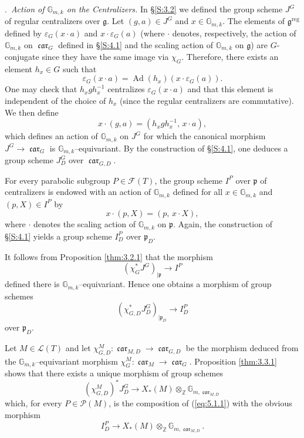 \documentclass[12pt,a4paper,oneside,english,leqno]{smfart}
\makeatletter
\numberwithin{equation}{subsection}
\numberwithin{theo}{subsection}
\newenvironment{paragr}[1][]{\medskip\refstepcounter{subsection}%
  \par\noindent\hspace*{\parindent}\thesubsection.\ \emph{#1}%
  \@ifundefined{@empty}{}{}\ignorespaces}{\medskip}
\theoremstyle{plain}
\theoremstyle{definition}
\theoremstyle{remark}
\DeclareMathOperator{\reg}{reg}
\DeclareMathOperator{\Ad}{Ad}
\DeclareMathOperator{\car}{\mathfrak{car}}
\newcommand{\ZZ}{\mathbb{Z}}
\newcommand{\Gmk}{\mathbb{G}_{m,k}}
\newcommand{\lc}{\mathcal{L}}
\newcommand{\fc}{\mathcal{F}}
\newcommand{\pc}{\mathcal{P}}
\newcommand{\ggo}{\mathfrak{g}}
\newcommand{\pgo}{\mathfrak{p}}
\newcommand{\eps}{\varepsilon}
\makeatother
\begin{document}
\begin{paragr}[Action of $\Gmk$ on the Centralizers.]\label{S:5.1}
In §\ref{S:3.2} we defined the group scheme $J^G$ of regular centralizers over $\ggo$. Let $(g,a)\in J^G$ and $x\in \Gmk$. The elements of $\ggo^{\reg}$ defined by $\eps_G(x\cdot a)$ and $x\cdot \eps_G(a)$ (where $\cdot$ denotes, respectively, the action of $\Gmk$ on $\car_G$ defined in §\ref{S:4.1} and the scaling action of $\Gmk$ on $\ggo$) are $G$-conjugate since they have the same image via $\chi_G$. Therefore, there exists an element $h_x\in G$ such that
$$\eps_G(x\cdot a)=\Ad(h_x)(x\cdot \eps_G(a)).$$
One may check that $h_x g h_x^{-1}$ centralizes $\eps_G(x\cdot a)$ and that this element is independent of the choice of $h_x$ (since the regular centralizers are commutative). We then define
$$x\cdot (g,a)= (h_x g h_x^{-1},\, x\cdot a),$$
which defines an action of $\Gmk$ on $J^G$ for which the canonical morphism $J^G \to \car_G$ is $\Gmk$–equivariant. By the construction of §\ref{S:4.1}, one deduces a group scheme $J^G_D$ over $\car_{G,D}$.

For every parabolic subgroup $P\in \fc(T)$, the group scheme $I^P$ over $\pgo$ of centralizers is endowed with an action of $\Gmk$ defined for all $x\in \Gmk$ and $(p,X)\in I^P$ by
$$x\cdot(p,X)=(p,\, x\cdot X),$$
where $\cdot$ denotes the scaling action of $\Gmk$ on $\pgo$. Again, the construction of §\ref{S:4.1} yields a group scheme $I^P_D$ over $\pgo_{D}$.

It follows from Proposition \ref{thm:3.2.1} that the morphism
$$(\chi_G^* J^G)_{|\pgo} \to I^P$$
defined there is $\Gmk$–equivariant. Hence one obtains a morphism of group schemes
\begin{equation}\label{eq:5.1.1}
  (\chi_{G,D}^* J^G_D)_{|\pgo_D} \to I^P_D
\end{equation}
over $\pgo_D$.

Let $M\in \lc(T)$ and let $\chi^M_{G,D}: \car_{M,D}\to \car_{G,D}$ be the morphism deduced from the $\Gmk$–equivariant morphism $\chi^M_G : \car_M \to \car_G$. Proposition \ref{thm:3.3.1} shows that there exists a unique morphism of group schemes
\begin{equation}\label{eq:5.1.2}
(\chi^M_{G,D})^*J_D^G\to X_*(M)\otimes_\ZZ \mathbb{G}_{m,\car_{M,D}}
\end{equation}
which, for every $P\in \pc(M)$, is the composition of (\ref{eq:5.1.1}) with the obvious morphism
$$I^P_D \to X_*(M)\otimes_\ZZ \mathbb{G}_{m,\car_{M,D}}.$$
\end{paragr}
\end{document}
